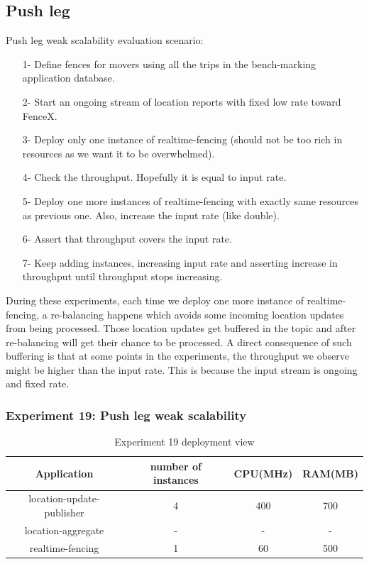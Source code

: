 \documentclass[a4]{report}
\begin{document}
    \subsection{Push leg}
    Push leg weak scalability evaluation scenario:
    \begin{itemize}
        \item[1-] Define fences for movers using all the trips in the bench-marking application database.
        \item[2-] Start an ongoing stream of location reports with fixed low rate toward FenceX.
        \item[3-] Deploy only one instance of realtime-fencing (should not be too rich in resources as we want it to
        be overwhelmed).
        \item[4-] Check the throughput.
        Hopefully it is equal to input rate.
        \item[5-] Deploy one more instances of realtime-fencing with exactly same resources as previous one. Also,
        increase the input rate (like double).
        \item[6-] Assert that throughput covers the input rate.
        \item[7-] Keep adding instances, increasing input rate and asserting increase in throughput until throughput
        stops increasing.
    \end{itemize}

    During these experiments, each time we deploy one more instance of realtime-fencing, a re-balancing happens which
    avoids some incoming location updates from being processed.
    Those location updates get buffered in the topic and after re-balancing will get their chance to be processed.
    A direct consequence of such buffering is that at some points in the experiments, the throughput we observe might be
    higher than the input rate.
    This is because the input stream is ongoing and fixed rate.

    \subsubsection{Experiment 19: Push leg weak scalability}
    \begin{table}[h!]
        \centering
        \begin{tabular}{|c|c|c|c|}
            \hline
            Application               & number of instances & CPU(MHz) & RAM(MB) \\
            \hline
            location-update-publisher & 4                   & 400      & 700     \\
            location-aggregate        & -                   & -        & -       \\
            realtime-fencing          & 1                   & 60       & 500     \\
            \hline
        \end{tabular}
        \caption{Experiment 19 deployment view}
        \label{table:ex19-dv}
    \end{table}
\end{document}
